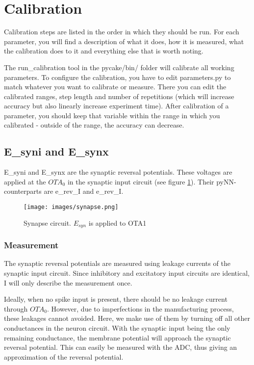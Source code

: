 \documentclass[12pt,a4paper,bibliography=totocnumbered,listof=totocnumbered]{scrartcl}
\begin{document}
\section{Calibration}
Calibration steps are listed in the order in which they should be run. For each parameter, you will find a description of what it does, how it is measured, what the calibration does to it and everything else that is worth noting.

The run\_calibration tool in the pycake/bin/ folder will calibrate all working parameters. To configure the calibration, you have to edit parameters.py to match whatever you want to calibrate or measure. There you can edit the calibrated ranges, step length and number of repetitions (which will increase accuracy but also linearly increase experiment time). After calibration of a parameter, you should keep that variable within the range in which you calibrated - outside of the range, the accuracy can decrease.

\subsection{E\_syni and E\_synx}
E\_syni and E\_synx are the synaptic reversal potentials. These voltages are applied at the $OTA_0$ in the synaptic input circuit (see figure \ref{figure:synapse}). Their pyNN-counterparts are e\_rev\_I and e\_rev\_I.

\begin{figure}[h]
\begin{center}
\texttt{[image: images/synapse.png]}
\caption{Synapse circuit. $E_{syn}$ is applied to OTA1}
\label{figure:synapse}
\end{center}
\end{figure}

\subsubsection*{Measurement}
The synaptic reversal potentials are measured using leakage currents of the synaptic input circuit. Since inhibitory and excitatory input circuits are identical, I will only describe the measurement once.

Ideally, when no spike input is present, there should be no leakage current through $OTA_0$. However, due to imperfections in the manufacturing process, these leakages cannot avoided. Here, we make use of them by turning off all other conductances in the neuron circuit. With the synaptic input being the only remaining conductance, the membrane potential will approach the synaptic reversal potential. This can easily be measured with the ADC, thus giving an approximation of the reversal potential.
\end{document}
